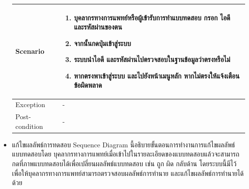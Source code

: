 \documentclass[12pt,oneside,openright,a4paper]{cpe-thai-project}
\begin{document}
\begin{itemize}
\begin{table}[!h]
\begin{tabular}{|p{4cm}|p{10cm}|}
      Scenario & \begin{enumerate}
        \item บุคลากรทางการแพทย์หรือผู้เข้ารับการทำแบบทดสอบ กรอก ไอดี และรหัสผ่านของตน
        \item จากนั้นกดปุ่มเข้าสู่ระบบ
        \item ระบบนำไอดี และรหัสผ่านไปตรวจสอบในฐานข้อมูลว่าตรงหรือไม่
        \item หากตรงพาเข้าสู่ระบบ และไปยังหน้าเมนูหลัก หากไม่ตรงให้แจ้งเตือนข้อผิดพลาด 
      \end{enumerate} \\ \hline
      Exception & - \\ \hline
      Post-condition & - \\ \hline
  
      \end{tabular}
      \end{table}
      \newpage
      \item แก้ไขผลลัพธ์การทดสอบ
      Sequence Diagram นี้อธิบายขั้นตอนการทำงานการแก้ไขผลลัพธ์แบบทดสอบโดย บุคลากรทางการแพทย์เมื่อเข้าไปในรายละเอียดของแบบทดสอบแล้วจะสามารถกดที่ภาพแบบทดสอบได้เพื่อเปลี่ยนผลลัพธ์แบบทดสอบ
       เช่น ถูก ผิด กลับด้าน โดยระบบนี้มีไว้เพื่อให้บุคลากรทางการแพทย์สามารถตรวจสอบผลลัพธ์การทำนาย และแก้ไขผลลัพธ์การทำนายได้ด้วย
      \begin{figure}[!ht]\centering
        \setlength{\fboxrule}{0.2mm} %
        \setlength{\fboxsep}{1cm}

\end{figure}
\end{itemize}
\end{document}
